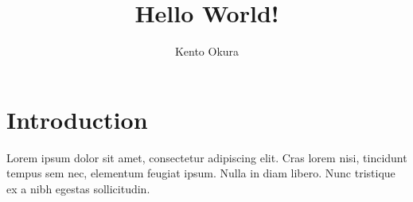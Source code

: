 \documentclass[a4paper,12pt]{article}
\begin{document}
  \title{Hello World!}
  \author{Kento Okura}
  \maketitle
  \section{Introduction}
  Lorem ipsum dolor sit amet, consectetur adipiscing elit. Cras lorem nisi, tincidunt tempus sem nec, elementum feugiat ipsum. Nulla in diam libero. Nunc tristique ex a nibh egestas sollicitudin.
\end{document}
